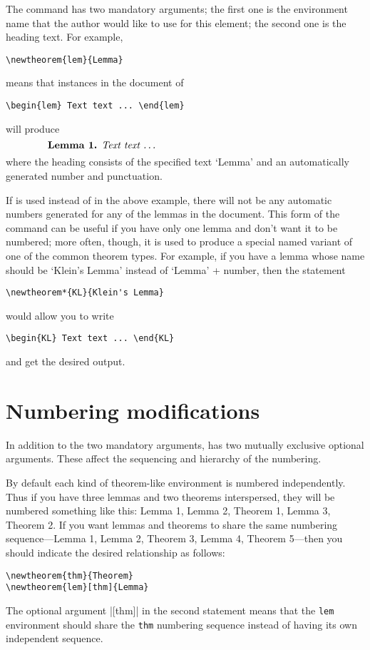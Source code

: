 \documentclass[leqno,titlepage,openany]{amsldoc}
\begin{document}
The  command has two mandatory arguments; the first one
is the environment name that the author would like to use for this
element; the second one is the heading text. For example,
\begin{verbatim}
\newtheorem{lem}{Lemma}
\end{verbatim}
means that instances in the document of
\begin{verbatim}
\begin{lem} Text text ... \end{lem}
\end{verbatim}
will produce
\[\makebox[.8\columnwidth]{%
  \textbf{Lemma 1.} \textit{Text text \dots}\hfill}\]
where the heading consists of the specified text `Lemma' and an
automatically generated number and punctuation.

If  is used instead of  in the above
example, there will not be any automatic numbers generated for
any of the lemmas in the document. This form of the command can be
useful if you have only one lemma and don't want it to be
numbered; more often, though, it is used to produce a special named
variant of one of the common theorem types. For example, if you have a
lemma whose name should be `Klein's Lemma' instead of `Lemma' +
number, then the statement
\begin{verbatim}
\newtheorem*{KL}{Klein's Lemma}
\end{verbatim}
would allow you to write
\begin{verbatim}
\begin{KL} Text text ... \end{KL}
\end{verbatim}
and get the desired output.

\section{Numbering modifications}

In addition to the two mandatory arguments,  has two
mutually exclusive optional arguments. These affect the
sequencing and hierarchy of the numbering.

By default each kind of theorem-like environment is numbered
independently. Thus if you have three lemmas and two theorems
interspersed, they will be numbered something like this: Lemma 1, Lemma
2, Theorem 1, Lemma 3, Theorem 2. If you want lemmas and theorems to
share the same numbering sequence---Lemma 1, Lemma 2, Theorem 3, Lemma
4, Theorem 5---then you should indicate the desired relationship as
follows:
\begin{verbatim}
\newtheorem{thm}{Theorem}
\newtheorem{lem}[thm]{Lemma}
\end{verbatim}
The optional argument |[thm]| in the second statement means that
the \texttt{lem} environment should share the \texttt{thm} numbering
sequence instead of having its own independent sequence.
\end{document}
